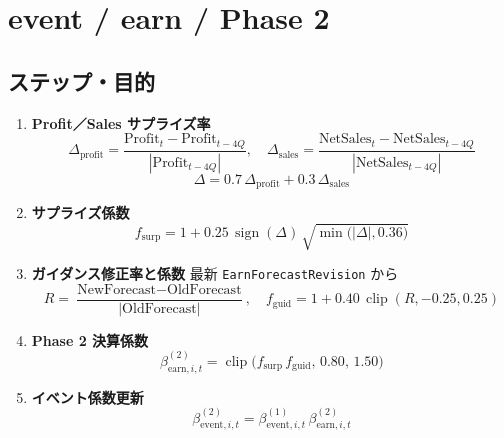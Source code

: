 
\section*{event / earn / Phase 2}\nopagebreak[4]
\subsection*{ステップ・目的}
\begin{flushleft}
\begin{enumerate}
  \item \textbf{Profit／Sales サプライズ率}\;
        \[
          \Delta_{\text{profit}}
            =\frac{\text{Profit}_t-\text{Profit}_{t-4Q}}
                   {|\text{Profit}_{t-4Q}|},\quad
          \Delta_{\text{sales}}
            =\frac{\text{NetSales}_t-\text{NetSales}_{t-4Q}}
                   {|\text{NetSales}_{t-4Q}|}
        \]
        \[
          \Delta = 0.7\,\Delta_{\text{profit}} + 0.3\,\Delta_{\text{sales}}
        \]

  \item \textbf{サプライズ係数}\;
        \[
          f_{\text{surp}}
            = 1 + 0.25\,\operatorname{sign}(\Delta)\,
              \sqrt{\min\!\bigl(|\Delta|,0.36\bigr)}
        \]

  \item \textbf{ガイダンス修正率と係数}\;
        最新 \texttt{EarnForecastRevision} から
        \[
          R=\frac{\text{NewForecast}-\text{OldForecast}}
                 {|\text{OldForecast}|},\quad
          f_{\text{guid}}
            = 1 + 0.40\,\operatorname{clip}(R,-0.25,0.25)
        \]

  \item \textbf{Phase 2 決算係数}\;
        \[
          \beta_{\text{earn},i,t}^{(2)}
            =\operatorname{clip}\bigl(
               f_{\text{surp}}\,f_{\text{guid}},\,0.80,\,1.50\bigr)
        \]

  \item \textbf{イベント係数更新}\;
        \[
          \beta_{\text{event},i,t}^{(2)}
            =\beta_{\text{event},i,t}^{(1)}\,
             \beta_{\text{earn},i,t}^{(2)}
        \]
\end{enumerate}
\end{flushleft}

